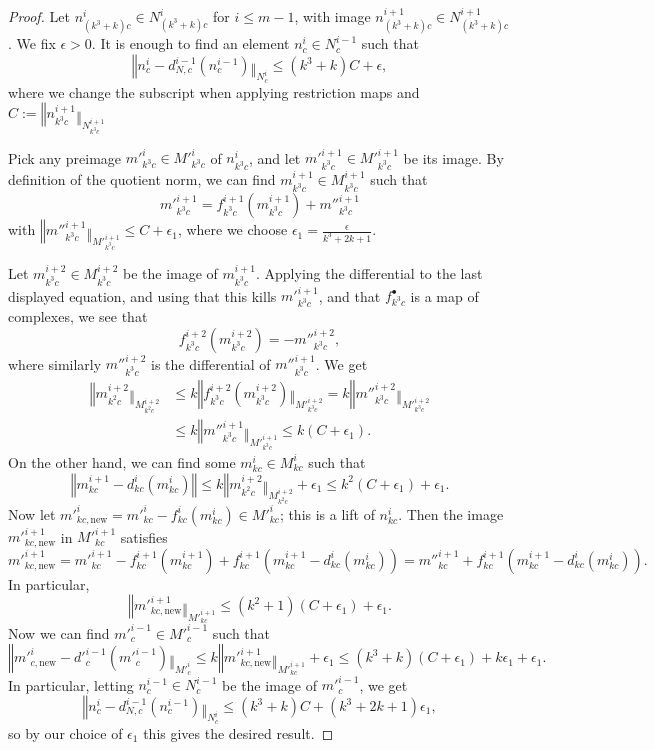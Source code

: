 \begin{proof}
\leanok
Let $n^i_{(k^3+k)c}\in N^i_{(k^3+k)c}$ for $i\leq m-1$, with image $n^{i+1}_{(k^3+k)c}\in N^{i+1}_{(k^3+k)c}$. We fix $\epsilon > 0$. It is enough to find an element $n^i_c\in N^{i-1}_c$ such that
\[
‖n^i_c - d^{i-1}_{N,c}(n^{i-1}_c)‖_{N^i_c}\leq (k^3+k)C + \epsilon,
\]
where we change the subscript when applying restriction maps and $C:=‖n^{i+1}_{k^3c}‖_{N^{i+1}_{k^3c}}$

Pick any preimage $m'^i_{k^3c}\in M'^i_{k^3c}$ of $n^i_{k^3c}$, and let $m'^{i+1}_{k^3c}\in M'^{i+1}_{k^3c}$ be its image. By definition of the quotient norm, we can find $m^{i+1}_{k^3c}\in M^{i+1}_{k^3c}$ such that
\[
m'^{i+1}_{k^3c} = f^{i+1}_{k^3c}(m^{i+1}_{k^3c}) + m''^{i+1}_{k^3c}
\]
with $‖m''^{i+1}_{k^3c}‖_{M'^{i+1}_{k^3c}}\leq C + \epsilon_1$, where we choose $\epsilon_1 = \frac{\epsilon}{k ^ 3 + 2k + 1}$.

Let $m^{i+2}_{k^3c}\in M^{i+2}_{k^3c}$ be the image of $m^{i+1}_{k^3c}$. Applying the differential to the last displayed equation, and using that this kills $m'^{i+1}_{k^3c}$, and that $f^\bullet_{k^3c}$ is a map of complexes, we see that
\[
f^{i+2}_{k^3c}(m^{i+2}_{k^3c}) = -m''^{i+2}_{k^3c},
\]
where similarly $m''^{i+2}_{k^3c}$ is the differential of $m''^{i+1}_{k^3c}$. We get
\[\begin{aligned}
‖m^{i+2}_{k^2c}‖_{M^{i+2}_{k^2c}}&\leq k‖f^{i+2}_{k^3c}(m^{i+2}_{k^3c})‖_{M'^{i+2}_{k^3c}} = k‖m''^{i+2}_{k^3c}‖_{M'^{i+2}_{k^3c}}\\
&\leq k‖m''^{i+1}_{k^3c}‖_{M'^{i+1}_{k^3c}}\leq k(C+\epsilon_1).
\end{aligned}\]
On the other hand, we can find some $m^i_{kc}\in M^i_{kc}$ such that
\[
‖m^{i+1}_{kc}-d^i_{kc}(m^i_{kc})‖\leq k‖m^{i+2}_{k^2c}‖_{M^{i+2}_{k^2c}} + \epsilon_1 \leq k^2(C+\epsilon_1) + \epsilon_1.
\]
Now let $m'^i_{kc,\mathrm{new}} = m'^i_{kc}-f^i_{kc}(m^i_{kc})\in M'^i_{kc}$; this is a lift of $n^i_{kc}$. Then the image $m'^{i+1}_{kc,\mathrm{new}}$ in $M'^{i+1}_{kc}$ satisfies
\[
m'^{i+1}_{kc,\mathrm{new}} = m'^{i+1}_{kc}-f^{i+1}_{kc}(m^{i+1}_{kc}) + f^{i+1}_{kc}(m^{i+1}_{kc}-d^i_{kc}(m^i_{kc})) = m''^{i+1}_{kc} + f^{i+1}_{kc}(m^{i+1}_{kc}-d^i_{kc}(m^i_{kc})).
\]
In particular,
\[
‖m'^{i+1}_{kc,\mathrm{new}}‖_{M'^{i+1}_{kc}}\leq (k^2 + 1)(C+\epsilon_1) + \epsilon_1.
\]
Now we can find $m'^{i-1}_c\in M'^{i-1}_c$ such that
\[
‖m'^i_{c,\mathrm{new}} - d'^{i-1}_c(m'^{i-1}_c)‖_{M'^i_c}\leq k‖m'^{i+1}_{kc,\mathrm{new}}‖_{M'^{i+1}_{kc}} + \epsilon_1 \leq (k^3+k)(C+\epsilon_1) + k\epsilon_1 + \epsilon_1.
\]
In particular, letting $n^{i-1}_c\in N^{i-1}_c$ be the image of $m'^{i-1}_c$, we get
\[
‖n^i_c - d^{i-1}_{N,c}(n^{i-1}_c)‖_{N^i_c}\leq (k^3+k)C+(k^3+2k+1)\epsilon_1,
\]
so by our choice of $\epsilon_1$ this gives the desired result.
\end{proof}


